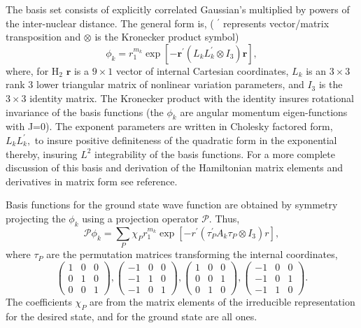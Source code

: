 The basis set consists of explicitly correlated Gaussian's multiplied by
powers of the inter-nuclear distance. 
The general form is, ( $^{\prime }$ represents vector/matrix transposition
and $\otimes $ is the Kronecker product symbol) 
\begin{equation} \label{basis}
 \phi _k =
  r_{1}^{m_k} \exp \left[ -\mathbf{r}^{\prime }
      \left( L_kL_k^{\prime }\otimes I_3\right)\mathbf{r}\right],
\end{equation}
where, for H$_2$ $ \mathbf{r}$ is a $9\times 1$ vector of internal 
Cartesian coordinates, $L_k$ is
an $3\times 3$ rank $3$ lower triangular matrix of nonlinear variation
parameters, and $I_3$ is the $3\times 3$ identity matrix. The Kronecker
product with the identity insures rotational invariance of the basis
functions (the $\phi _k$ are angular momentum eigen-functions with J=0). The
exponent parameters are written in Cholesky factored form, 
$L_kL_k^{\prime },$ 
to insure positive definiteness of the quadratic form in the exponential
thereby, insuring $L^2$ integrability of the basis functions.
For a more complete discussion of
this basis and derivation of the Hamiltonian matrix elements and derivatives
in matrix form see reference\cite{Kinghorn99a}.

Basis functions for the ground state wave function 
are obtained by symmetry
projecting the $\phi _k$ using a  projection operator
$\mathcal{P}$. Thus,
\begin{equation}
{\mathcal{P}} \phi_{k} = \sum_{P} \chi_{P} r_{1}^{m_{k}} 
     \exp \left[-r^{\prime} \left( \tau_{P}^{\prime} A_{k} \tau_{P}
                                    \otimes I_{3} \right) r \right],
\end{equation}
where $\tau_{P} $ are the permutation matrices transforming the
internal coordinates, 
\begin{equation}
\left( 
\begin{array}{ccc}
1 & 0 & 0 \\ 
0 & 1 & 0 \\
0 & 0 & 1
\end{array} 
\right),
\left( 
\begin{array}{ccc}
-1 & 0 & 0 \\ 
-1 & 1 & 0 \\
-1 & 0 & 1
\end{array} 
\right),
\left( 
\begin{array}{ccc}
1 & 0 & 0 \\ 
0 & 0 & 1 \\
0 & 1 & 0
\end{array} 
\right),
\left( 
\begin{array}{ccc}
-1 & 0 & 0 \\ 
-1 & 0 & 1 \\
-1 & 1 & 0
\end{array} 
\right).
\end{equation}
The coefficients $\chi_{P}$ are from the matrix elements of the irreducible
representation for the desired state, and for the ground state are all ones.

